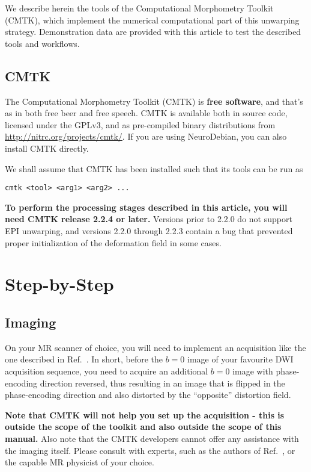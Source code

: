 \documentclass{InsightArticle}
\begin{document}
We describe herein the tools of the Computational Morphometry Toolkit (CMTK),
which implement the numerical computational part of this unwarping
strategy. Demonstration data are provided with this article to test the
described tools and workflows.

\subsection{CMTK}

The Computational Morphometry Toolkit (CMTK) is {\bf free software}, and
that's as in both free beer and free speech. CMTK is available both in source
code, licensed under the GPLv3, and as pre-compiled binary distributions from
\url{http://nitrc.org/projects/cmtk/}. If you are using NeuroDebian, you can
also install CMTK directly.

We shall assume that CMTK has been installed such that its tools can be run as
\begin{verbatim}
cmtk <tool> <arg1> <arg2> ...
\end{verbatim}

{\bf To perform the processing stages described in this article, you will need
CMTK release 2.2.4 or later.} Versions prior to 2.2.0 do not support EPI
unwarping, and versions 2.2.0 through 2.2.3 contain a bug that prevented
proper initialization of the deformation field in some cases.

\section{Step-by-Step}

\subsection{Imaging}

On your MR scanner of choice, you will need to implement an acquisition like
the one described in Ref.~\cite{HollKupeDale:2010}. In short, before the $b=0$
image of your favourite DWI acquisition sequence, you need to acquire an
additional $b=0$ image with phase-encoding direction reversed, thus resulting
in an image that is flipped in the phase-encoding direction and also distorted
by the ``opposite'' distortion field. 

{\bf Note that CMTK will not help you set up the acquisition - this is outside
the scope of the toolkit and also outside the scope of this manual.} Also note
that the CMTK developers cannot offer any assistance with the imaging
itself. Please consult with experts, such as the authors of
Ref.~\cite{HollKupeDale:2010}, or the capable MR physicist of your choice.
\end{document}
